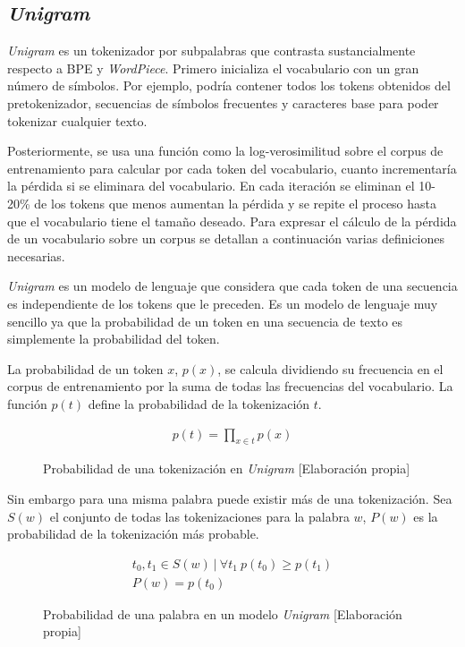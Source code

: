 \subsection{\textit{Unigram}}
\textit{Unigram} \cite{Kudo2018Apr} es un tokenizador por subpalabras que contrasta sustancialmente respecto a BPE y \textit{WordPiece}. Primero inicializa el vocabulario con un gran número de símbolos. Por ejemplo, podría contener todos los tokens obtenidos del pretokenizador, secuencias de símbolos frecuentes y caracteres base para poder tokenizar cualquier texto.

Posteriormente, se usa una función como la log-verosimilitud sobre el corpus de entrenamiento para calcular por cada token del vocabulario, cuanto incrementaría la pérdida si se eliminara del vocabulario. En cada iteración se eliminan el 10-20\% de los tokens que menos aumentan la pérdida y se repite el proceso hasta que el vocabulario tiene el tamaño deseado. Para expresar el cálculo de la pérdida de un vocabulario sobre un corpus se detallan a continuación varias definiciones necesarias.

\textit{Unigram} es un modelo de lenguaje que considera que cada token de una secuencia es independiente de los tokens que le preceden. Es un modelo de lenguaje muy sencillo ya que la probabilidad de un token en una secuencia de texto es simplemente la probabilidad del token.

La probabilidad de un token $x$, $p(x)$, se calcula dividiendo su frecuencia en el corpus de entrenamiento por la suma de todas las frecuencias del vocabulario. La función $p(t)$ define la probabilidad de la tokenización $t$.

\begin{figure}[H]
\begin{gather*}
    p(t) = \prod_{x\in{t}}{p(x)}
\end{gather*}
\caption{Probabilidad de una tokenización en \textit{Unigram} [Elaboración propia]}
\end{figure}
Sin embargo para una misma palabra puede existir más de una tokenización. Sea $S(w)$ el conjunto de todas las tokenizaciones para la palabra $w$, $P(w)$ es la probabilidad de la tokenización más probable.
\begin{figure}[H]
    \begin{gather*}
        t_{0},t_{1}\in S(w)\ |\ \forall{t_{1}}\ p(t_{0}) \geq p(t_{1})\\
        P(w) = p(t_{0})
    \end{gather*}
    \caption{Probabilidad de una palabra en un modelo \textit{Unigram} [Elaboración propia]}
\end{figure}

